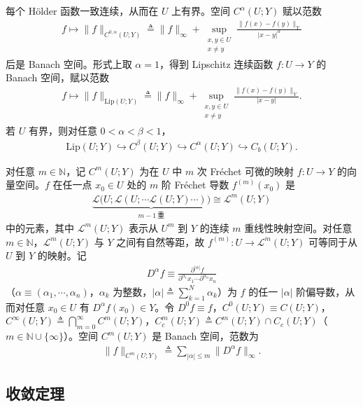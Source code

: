 \documentclass[../../main.tex]{subfiles}%
\begin{document}
每个 Hölder 函数一致连续，从而在 $U$ 上有界。空间 $C^\alpha(U;Y)$ 赋以范数
\begin{align*}
f\mapsto\|f\|_{C^{0,\alpha}(U;Y)}\triangleq \|f\|_\infty+\sup_{\substack{x,y\in U\\x\neq y}}\frac{\|f(x)-f(y)\|_Y}{|x-y|^\alpha}
\end{align*}
后是 Banach 空间。形式上取 $\alpha=1$，得到 Lipschitz 连续函数 $f:U\to Y$ 的 Banach 空间，赋以范数
\begin{align*}
f\mapsto\|f\|_{\mathrm{Lip}(U;Y)}\triangleq \|f\|_\infty+\sup_{\substack{x,y\in U\\x\neq y}}\frac{\|f(x)-f(y)\|_Y}{|x-y|}.
\end{align*}
若 $U$ 有界，则对任意 $0<\alpha<\beta<1$，
\begin{align*}
\mathrm{Lip}(U;Y)\hookrightarrow C^\beta(U;Y)\hookrightarrow C^\alpha(U;Y)\hookrightarrow C_b(U;Y).
\end{align*}

对任意 $m\in\mathbb{N}$，记 $C^m(U;Y)$ 为在 $U$ 中 $m$ 次 Fréchet 可微的映射 $f:U\to Y$ 的向量空间。$f$ 在任一点 $x_0\in U$ 处的 $m$ 阶 Fréchet 导数 $f^{(m)}(x_0)$ 是
\begin{align*}
\underbrace{\mathcal{L}\big(U;\mathcal{L}(U;\cdots\mathcal{L}(U;Y)\cdots )\big)}_{m-1\ \text{重}}\cong\mathcal{L}^m(U;Y)
\end{align*}
中的元素，其中 $\mathcal{L}^m(U;Y)$ 表示从 $U^m$ 到 $Y$ 的连续 $m$ 重线性映射空间。对任意 $m\in\mathbb{N}$，$\mathcal{L}^m(U;Y)$ 与 $Y$ 之间有自然等距，故 $f^{(m)}:U\to\mathcal{L}^m(U;Y)$ 可等同于从 $U$ 到 $Y$ 的映射。记
\begin{align*}
D^\alpha f\equiv\frac{\partial^{|\alpha|}f}{\partial^{\alpha_1}x_1\cdots \partial^{\alpha_n}x_n}
\end{align*}
（$\alpha\equiv(\alpha_1,\cdots ,\alpha_n)$，$\alpha_k$ 为整数，$|\alpha|\triangleq \sum_{k=1}^N\alpha_k$）为 $f$ 的任一 $|\alpha|$ 阶偏导数，从而对任意 $x_0\in U$ 有 $D^\alpha f(x_0)\in Y$。令 $D^0f\equiv f$，$C^0(U;Y)\equiv C(U;Y)$，$C^\infty(U;Y)\triangleq \bigcap_{m=0}^\infty C^m(U;Y)$，$C_c^m(U;Y)\triangleq C^m(U;Y)\cap C_c(U;Y)$（$m\in\mathbb{N}\cup\{\infty\}$）。空间 $C^m(U;Y)$ 是 Banach 空间，范数为
\begin{align*}
\|f\|_{C^m(U;Y)}\triangleq \sum_{|\alpha|\leqslant m}\|D^\alpha f\|_\infty.
\end{align*}

\subsection{收敛定理}\label{subsection:ch04-收敛定理}
\end{document}
